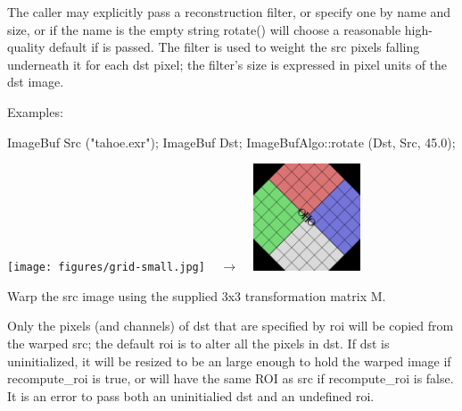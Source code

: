 The caller may explicitly pass a reconstruction filter, or specify one by
name and size, or if the name is the empty string {\cf rotate()} will choose
a reasonable high-quality default if \NULL is passed.  The filter is used to
weight the {\cf src} pixels falling underneath it for each {\cf dst} pixel;
the filter's size is expressed in pixel units of the {\cf dst} image.

\smallskip
\noindent Examples:
\begin{code}
    ImageBuf Src ("tahoe.exr");
    ImageBuf Dst;
    ImageBufAlgo::rotate (Dst, Src, 45.0);
\end{code}
\spc \texttt{[image: figures/grid-small.jpg]} 
~ {\Huge $\rightarrow$} ~
\includegraphics[width=1.25in]{figures/rotate45.jpg} \\
\apiend


 

Warp the {\cf src} image using the supplied 3x3 transformation matrix {\cf M}.

Only the pixels (and channels) of {\cf dst} that are specified by {\cf roi}
will be copied from the warped {\cf src}; the default {\cf roi} is to alter
all the pixels in {\cf dst}. If {\cf dst} is uninitialized, it will be
resized to be an \ImageBuf large enough to hold the warped image if
{\cf recompute_roi} is {\cf true}, or will have the same ROI as {\cf src}
if {\cf recompute_roi} is false. It is an
error to pass both an uninitialied {\cf dst} and an undefined {\cf roi}.

